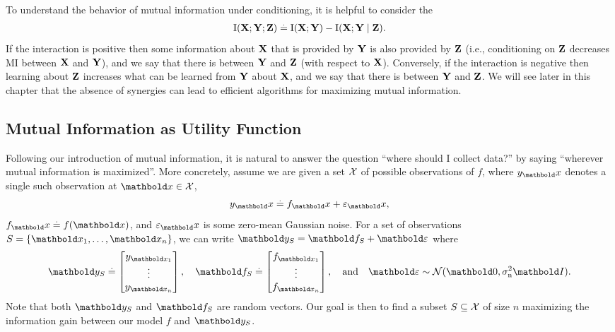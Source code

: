 To understand the behavior of mutual information under conditioning, it is helpful to consider the  \begin{align}
  \I{\rX}{\rY ; \rZ} \defeq \I{\rX}{\rY} - \I{\rX}{\rY \mid \rZ}. \label{eq:interaction_information}
\end{align}
If the interaction is positive then some information about $\mathbf{X}$ that is provided by $\mathbf{Y}$ is also provided by $\mathbf{Z}$ (i.e., conditioning on $\mathbf{Z}$ decreases MI between $\mathbf{X}$ and $\mathbf{Y}$), and we say that there is  between $\mathbf{Y}$ and $\mathbf{Z}$ (with respect to $\mathbf{X}$).
Conversely, if the interaction is negative then learning about $\mathbf{Z}$ increases what can be learned from $\mathbf{Y}$ about $\mathbf{X}$, and we say that there is  between $\mathbf{Y}$ and $\mathbf{Z}$.
We will see later in this chapter that the absence of synergies can lead to efficient algorithms for maximizing mutual information.


\subsection{Mutual Information as Utility Function}

Following our introduction of mutual information, it is natural to answer the question ``where should I collect data?'' by saying ``wherever mutual information is maximized''.
More concretely, assume we are given a set $\mathcal{X}$ of possible observations of $f$, where $y_\vx$ denotes a single such observation at $\vx \in \spX$, \begin{align}
  y_\vx \defeq f_\vx + \varepsilon_\vx,
\end{align} $f_\vx \defeq f(\vx)$, and $\varepsilon_\vx$ is some zero-mean Gaussian noise.
For a set of observations $\sS = \{\vx_1, \dots, \vx_n\}$, we can write $\vy_\sS = \vf_\sS + \vvarepsilon$ where \begin{align*}
  \vy_\sS \defeq \begin{bmatrix}
    y_{\vx_1} \\ \vdots \\ y_{\vx_n}
  \end{bmatrix}, \quad \vf_\sS \defeq \begin{bmatrix}
    f_{\vx_1} \\ \vdots \\ f_{\vx_n}
  \end{bmatrix}, \quad\text{and}\quad \vvarepsilon \sim \N{\vzero}{\sigman^2 \mI}.
\end{align*}
Note that both $\vy_\sS$ and $\vf_\sS$ are random vectors.
Our goal is then to find a subset $S \subseteq \mathcal{X}$ of size $n$ maximizing the information gain between our model $f$ and $\vy_\sS$.

